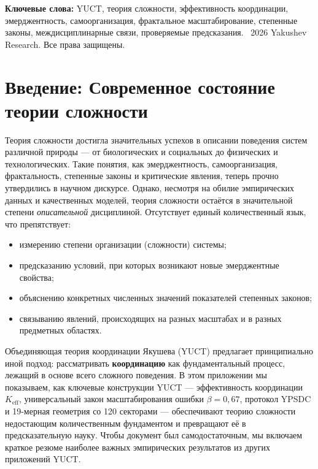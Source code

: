 \documentclass[11pt]{article}
\theoremstyle{remark}
\newcommand{\Keff}{K_{\mathrm{eff}}}
\begin{document}
\begin{titlepage}
\begin{abstract}
		\end{abstract}
		\vspace{0.5cm}
		\noindent
		{\small\textbf{Ключевые слова:}} YUCT, теория сложности, эффективность координации, эмерджентность, самоорганизация, фрактальное масштабирование, степенные законы, междисциплинарные связи, проверяемые предсказания.
		\vspace{0.2cm}
		\noindent
		\textcopyright\ 2026 Yakushev Research. Все права защищены.
	\end{titlepage}
	
	\tableofcontents
	\newpage
	
	\section{Введение: Современное состояние теории сложности}
	\label{sec:intro}
	
	Теория сложности достигла значительных успехов в описании поведения систем различной природы — от биологических и социальных до физических и технологических. Такие понятия, как эмерджентность, самоорганизация, фрактальность, степенные законы и критические явления, теперь прочно утвердились в научном дискурсе. Однако, несмотря на обилие эмпирических данных и качественных моделей, теория сложности остаётся в значительной степени \emph{описательной} дисциплиной. Отсутствует единый количественный язык, что препятствует:
	\begin{itemize}
		\item измерению степени организации (сложности) системы;
		\item предсказанию условий, при которых возникают новые эмерджентные свойства;
		\item объяснению конкретных численных значений показателей степенных законов;
		\item связыванию явлений, происходящих на разных масштабах и в разных предметных областях.
	\end{itemize}
	
	Объединяющая теория координации Якушева (YUCT) предлагает принципиально иной подход: рассматривать \textbf{координацию} как фундаментальный процесс, лежащий в основе всего сложного поведения. В этом приложении мы показываем, как ключевые конструкции YUCT — эффективность координации \(\Keff\), универсальный закон масштабирования ошибки \(\beta = 0,67\), протокол YPSDC и 19-мерная геометрия со 120 секторами — обеспечивают теорию сложности недостающим количественным фундаментом и превращают её в предсказательную науку. Чтобы документ был самодостаточным, мы включаем краткое резюме наиболее важных эмпирических результатов из других приложений YUCT.
	
\end{document}
